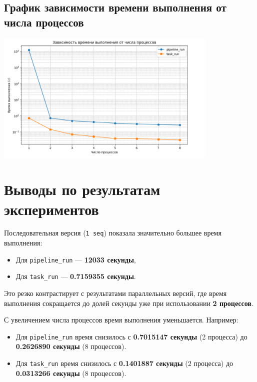 \documentclass{article}
\begin{document}
\subsection*{График зависимости времени выполнения от числа процессов}
\begin{center}
\includegraphics[width=0.8\textwidth]{photo_2024-12-27_15-24-11.jpg}
\end{center}
\raggedright
 \vspace{1cm}

\section{Выводы по результатам экспериментов}

Последовательная версия (\texttt{1 seq}) показала значительно большее время выполнения: 
\begin{itemize}
    \item Для \texttt{pipeline\_run} — \textbf{12033 секунды},
    \item Для \texttt{task\_run} — \textbf{0.7159355 секунды}.
\end{itemize}

Это резко контрастирует с результатами параллельных версий, где время выполнения сокращается до долей секунды уже при использовании \textbf{2 процессов}.

С увеличением числа процессов время выполнения уменьшается. Например:

\begin{itemize}
    \item Для \texttt{pipeline\_run} время снизилось с \textbf{0.7015147 секунды} (2 процесса) до \textbf{0.2626890 секунды} (8 процессов).
    \item Для \texttt{task\_run} время снизилось с \textbf{0.1401887 секунды} (2 процесса) до \textbf{0.0313266 секунды} (8 процессов).
\end{itemize}
\end{document}
